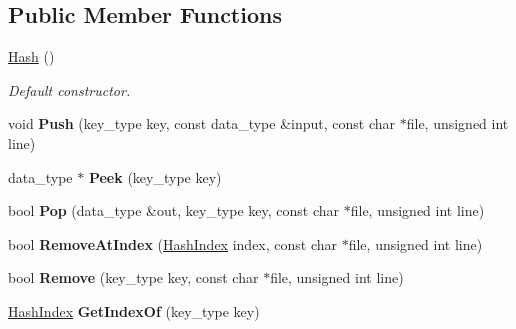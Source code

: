 \subsection*{Public Member Functions}
\begin{DoxyCompactItemize}
\item 
\hypertarget{class_data_structures_1_1_hash_a3716d1c6b0352bfa6313fece8e16d8e5}{\hyperlink{class_data_structures_1_1_hash_a3716d1c6b0352bfa6313fece8e16d8e5}{Hash} ()}\label{class_data_structures_1_1_hash_a3716d1c6b0352bfa6313fece8e16d8e5}

\begin{DoxyCompactList}\small\item\em Default constructor. \end{DoxyCompactList}\item 
\hypertarget{class_data_structures_1_1_hash_a1cd78525c3b53c60fc5a6f1f722d53f2}{void {\bfseries Push} (key\-\_\-type key, const data\-\_\-type \&input, const char $\ast$file, unsigned int line)}\label{class_data_structures_1_1_hash_a1cd78525c3b53c60fc5a6f1f722d53f2}

\item 
\hypertarget{class_data_structures_1_1_hash_a16224661ed046276b9465b5506df03a8}{data\-\_\-type $\ast$ {\bfseries Peek} (key\-\_\-type key)}\label{class_data_structures_1_1_hash_a16224661ed046276b9465b5506df03a8}

\item 
\hypertarget{class_data_structures_1_1_hash_a5c3f84193a5b2d74f0138a340215679a}{bool {\bfseries Pop} (data\-\_\-type \&out, key\-\_\-type key, const char $\ast$file, unsigned int line)}\label{class_data_structures_1_1_hash_a5c3f84193a5b2d74f0138a340215679a}

\item 
\hypertarget{class_data_structures_1_1_hash_a72237d005a83cfc02f2b573ac4336cd0}{bool {\bfseries Remove\-At\-Index} (\hyperlink{struct_data_structures_1_1_hash_index}{Hash\-Index} index, const char $\ast$file, unsigned int line)}\label{class_data_structures_1_1_hash_a72237d005a83cfc02f2b573ac4336cd0}

\item 
\hypertarget{class_data_structures_1_1_hash_a4a05c05066a1de28b05c497791ae85ee}{bool {\bfseries Remove} (key\-\_\-type key, const char $\ast$file, unsigned int line)}\label{class_data_structures_1_1_hash_a4a05c05066a1de28b05c497791ae85ee}

\item 
\hypertarget{class_data_structures_1_1_hash_af31d2ff3160e0d7e0275faf0a2e35fb7}{\hyperlink{struct_data_structures_1_1_hash_index}{Hash\-Index} {\bfseries Get\-Index\-Of} (key\-\_\-type key)}\label{class_data_structures_1_1_hash_af31d2ff3160e0d7e0275faf0a2e35fb7}


\end{DoxyCompactItemize}
